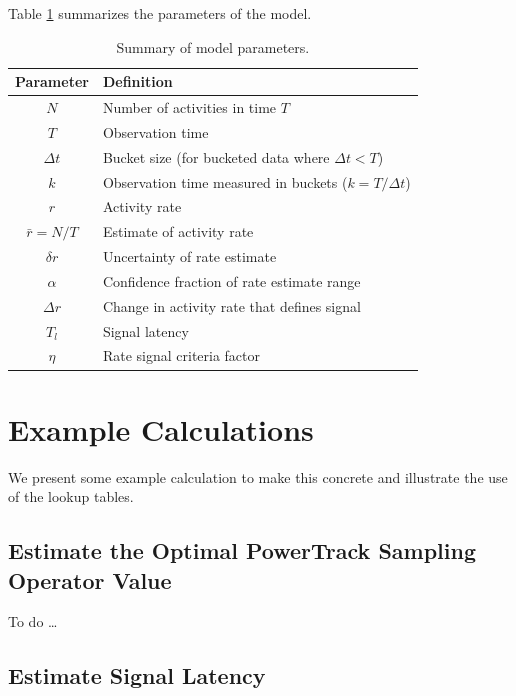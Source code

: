 \documentclass{article}
\begin{document}
Table \ref{tab:summary} summarizes the parameters of the model.

\begin{table}
    \begin{tabular}{c| m{7cm}}
     \hline
Parameter  & Definition \\
\hline	
$N$ & Number of activities in time $T$\\
$T$ & Observation time\\
$\Delta t$ & Bucket size (for bucketed data where $\Delta t <T$) \\
$k$ & Observation time measured in buckets ($k=T/\Delta t$) \\
$r$ & Activity rate \\
$\bar{r} = N/T$ & Estimate of activity rate \\
$\delta r$ & Uncertainty of rate estimate \\
$\alpha$ & Confidence fraction of rate estimate range\\
$\Delta r$ & Change in activity rate that defines signal \\
$T_l$ & Signal latency \\
$\eta$ & Rate signal criteria factor \\
\hline
\end{tabular}
\caption{Summary of model parameters.}
\label{tab:summary}
\end{table}

\section{Example Calculations} 

We present some example calculation to make this concrete and illustrate the use of the lookup tables.

\subsection{Estimate the Optimal PowerTrack Sampling Operator Value} 

To do \ldots

\subsection{Estimate Signal Latency} 

\end{document}
